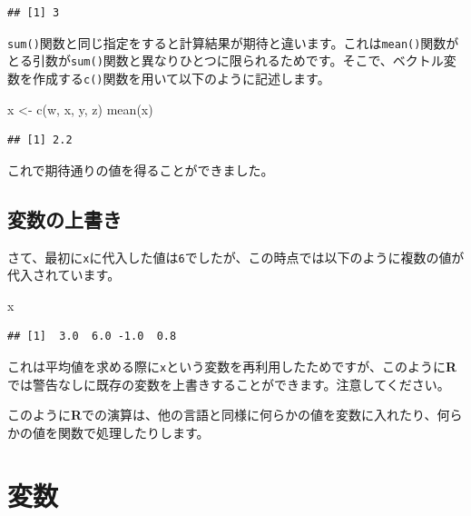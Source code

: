 \documentclass[
  12pt,
]{book}
\newenvironment{Shaded}{\begin{snugshade}}{\end{snugshade}}
\newcommand{\FunctionTok}[1]{\textcolor[rgb]{0.00,0.00,0.00}{#1}}
\newcommand{\NormalTok}[1]{#1}
\newcommand{\OtherTok}[1]{\textcolor[rgb]{0.56,0.35,0.01}{#1}}
\begin{document}
\begin{verbatim}
## [1] 3
\end{verbatim}

\texttt{sum()}関数と同じ指定をすると計算結果が期待と違います。これは\texttt{mean()}関数がとる引数が\texttt{sum()}関数と異なりひとつに限られるためです。そこで、ベクトル変数を作成する\texttt{c()}関数を用いて以下のように記述します。

\begin{Shaded}
\begin{Highlighting}[]
\NormalTok{x }\OtherTok{\textless{}{-}} \FunctionTok{c}\NormalTok{(w, x, y, z)}
\FunctionTok{mean}\NormalTok{(x)}
\end{Highlighting}
\end{Shaded}

\begin{verbatim}
## [1] 2.2
\end{verbatim}

これで期待通りの値を得ることができました。

\hypertarget{ux5909ux6570ux306eux4e0aux66f8ux304d}{%
\subsection{変数の上書き}\label{ux5909ux6570ux306eux4e0aux66f8ux304d}}

さて、最初に\texttt{x}に代入した値は\texttt{6}でしたが、この時点では以下のように複数の値が代入されています。

\begin{Shaded}
\begin{Highlighting}[]
\NormalTok{x}
\end{Highlighting}
\end{Shaded}

\begin{verbatim}
## [1]  3.0  6.0 -1.0  0.8
\end{verbatim}

これは平均値を求める際に\texttt{x}という変数を再利用したためですが、このように\textbf{R}では警告なしに既存の変数を上書きすることができます。注意してください。

このように\textbf{R}での演算は、他の言語と同様に何らかの値を変数に入れたり、何らかの値を関数で処理したりします。

\hypertarget{ux5909ux6570}{%
\section{変数}\label{ux5909ux6570}}
\end{document}
